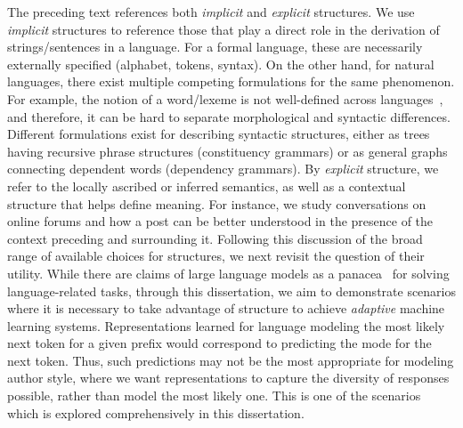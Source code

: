 The preceding text references both \textit{implicit} and \textit{explicit} structures. 
We use \textit{implicit} structures to reference those that play a direct role in the derivation of strings/sentences in a language.
For a formal language, these are necessarily externally specified (alphabet, tokens, syntax).
On the other hand, for natural languages, there exist multiple competing formulations for the same phenomenon.
For example, the notion of a word/lexeme is not well-defined across languages~\cite{martin2017indeterminacy}, and therefore, it can be hard to separate morphological and syntactic differences. 
Different formulations exist for describing syntactic structures, either as trees having recursive phrase structures (constituency grammars) or as general graphs connecting dependent words (dependency grammars).
By \textit{explicit} structure, we refer to the locally ascribed or inferred semantics, as well as a contextual structure that helps define meaning.
For instance, we study conversations on online forums and how a post can be better understood in the presence of the context preceding and surrounding it.
Following this discussion of the broad range of available choices for structures, we next revisit the question of their utility.
While there are claims of large language models as a panacea~\citep{bommasani2021foundationmodels} for solving language-related tasks, through this dissertation, we aim to demonstrate scenarios where it is necessary to take advantage of structure to achieve \textit{adaptive} machine learning systems.
Representations learned for language modeling the most likely next token for a given prefix would correspond to predicting the mode for the next token.
Thus, such predictions may not be the most appropriate for modeling author style, where we want representations to capture the diversity of responses possible, rather than model the most likely one.
This is one of the scenarios which is explored comprehensively in this dissertation.




